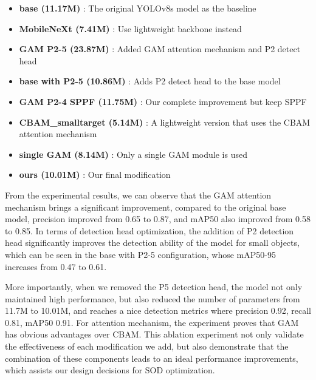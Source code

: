 \documentclass[10pt]{article}
\begin{document}
\begin{itemize}

\item \textbf{base (11.17M)} : The original YOLOv8s model as the baseline

\item \textbf{MobileNeXt (7.41M)} : Use lightweight backbone instead

\item \textbf{GAM P2-5 (23.87M)} : Added GAM attention mechanism and P2 detect head

\item \textbf{base with P2-5 (10.86M)} : Adds P2 detect head to the base model

\item \textbf{GAM P2-4 SPPF (11.75M)} : Our complete improvement but keep SPPF

\item \textbf{CBAM\_smalltarget (5.14M)} : A lightweight version that uses the CBAM attention mechanism

\item \textbf{single GAM (8.14M)} : Only a single GAM module is used

\item \textbf{ours (10.01M)} : Our final modification

\end{itemize}


From the experimental results, we can observe that the GAM attention mechanism brings a significant improvement, compared to the original base model, precision improved from 0.65 to 0.87, and mAP50 also improved from 0.58 to 0.85. In terms of detection head optimization, the addition of P2 detection head significantly improves the detection ability of the model for small objects, which can be seen in the base with P2-5 configuration, whose mAP50-95 increases from 0.47 to 0.61.

More importantly, when we removed the P5 detection head, the model not only maintained high performance, but also reduced the number of parameters from 11.7M to 10.01M, and reaches a nice detection metrics where precision 0.92, recall 0.81, mAP50 0.91. For attention mechanism, the experiment proves that GAM has obvious advantages over CBAM. This ablation experiment not only validate the effectiveness of each modification we add, but also demonstrate that the combination of these components leads to an ideal performance improvements, which assists our design decisions for SOD optimization.
\end{document}
